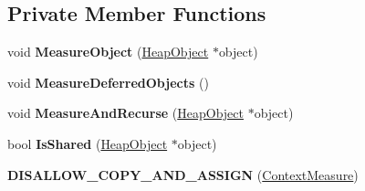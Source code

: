 \subsection*{Private Member Functions}
\begin{DoxyCompactItemize}
\item 
void {\bfseries Measure\+Object} (\hyperlink{classv8_1_1internal_1_1_heap_object}{Heap\+Object} $\ast$object)\hypertarget{classv8_1_1internal_1_1_context_measure_af5b26152af74f57ccbce46c49050d3f0}{}\label{classv8_1_1internal_1_1_context_measure_af5b26152af74f57ccbce46c49050d3f0}

\item 
void {\bfseries Measure\+Deferred\+Objects} ()\hypertarget{classv8_1_1internal_1_1_context_measure_a24d313559450a1175ff7459b8faf7d73}{}\label{classv8_1_1internal_1_1_context_measure_a24d313559450a1175ff7459b8faf7d73}

\item 
void {\bfseries Measure\+And\+Recurse} (\hyperlink{classv8_1_1internal_1_1_heap_object}{Heap\+Object} $\ast$object)\hypertarget{classv8_1_1internal_1_1_context_measure_acfe8680fda83b1405cc40fa625e2f9f2}{}\label{classv8_1_1internal_1_1_context_measure_acfe8680fda83b1405cc40fa625e2f9f2}

\item 
bool {\bfseries Is\+Shared} (\hyperlink{classv8_1_1internal_1_1_heap_object}{Heap\+Object} $\ast$object)\hypertarget{classv8_1_1internal_1_1_context_measure_a6f6d8d09ee9cb7da47a87a721b73765d}{}\label{classv8_1_1internal_1_1_context_measure_a6f6d8d09ee9cb7da47a87a721b73765d}

\item 
{\bfseries D\+I\+S\+A\+L\+L\+O\+W\+\_\+\+C\+O\+P\+Y\+\_\+\+A\+N\+D\+\_\+\+A\+S\+S\+I\+GN} (\hyperlink{classv8_1_1internal_1_1_context_measure}{Context\+Measure})\hypertarget{classv8_1_1internal_1_1_context_measure_aabea956b9b7bdc77e415cf4507b579df}{}\label{classv8_1_1internal_1_1_context_measure_aabea956b9b7bdc77e415cf4507b579df}

\end{DoxyCompactItemize}
